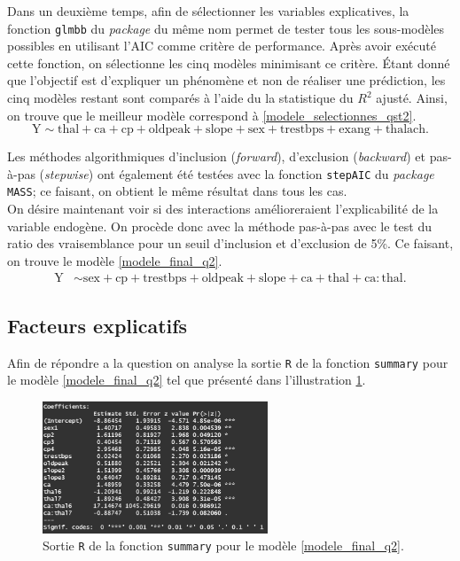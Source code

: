 \documentclass{article}
\begin{document}
	Dans un deuxième temps, afin de sélectionner les variables explicatives, la fonction \texttt{glmbb} du \textit{package} du même nom permet de tester tous les sous-modèles possibles en utilisant l'AIC comme critère de performance. Après avoir exécuté cette fonction, on sélectionne les cinq modèles minimisant ce critère. Étant donné que l'objectif est d'expliquer un phénomène et non de réaliser une prédiction, les cinq modèles restant sont comparés à l'aide du la statistique du $R^2$ ajusté. Ainsi, on trouve que le meilleur modèle correspond à \eqref{modele_selectionnes_qst2}.
	\begin{equation}\label{modele_selectionnes_qst2}
		\mathrm{Y} \sim \mathrm{thal + ca + cp + oldpeak + slope + sex + trestbps + 
		exang + thalach}.
	\end{equation}
	
	Les méthodes algorithmiques d'inclusion (\textit{forward}), d'exclusion (\textit{backward}) et pas-à-pas (\textit{stepwise}) ont également été testées avec la fonction \texttt{stepAIC} du \textit{package} \texttt{MASS}; ce faisant, on obtient le même résultat dans tous les cas.\\
	
	On désire maintenant voir si des interactions amélioreraient l'explicabilité de la variable endogène. On procède donc avec la méthode pas-à-pas avec le test du ratio des vraisemblance pour un seuil d'inclusion et d'exclusion de 5\%. Ce faisant, on trouve le modèle \eqref{modele_final_q2}.
	\begin{align}\label{modele_final_q2}
		\mathrm{Y} &\sim \mathrm{sex + cp + trestbps + oldpeak + slope + ca + thal + ca:thal}.
	\end{align}		
	
	
	\subsection{Facteurs explicatifs}
	Afin de répondre a la question on analyse la sortie \texttt{R} de la fonction \texttt{summary} pour le modèle \eqref{modele_final_q2} tel que présenté dans l'illustration \ref{model_final_q2_sommaire}.
	\begin{figure}[H]
		\centering
		\includegraphics[width=0.6\textwidth]{graphiques/model_final_q2_sommaire}
		\caption{Sortie \texttt{R} de la fonction \texttt{summary} pour le modèle \eqref{modele_final_q2}.}
		\label{model_final_q2_sommaire}
	\end{figure}
\end{document}
